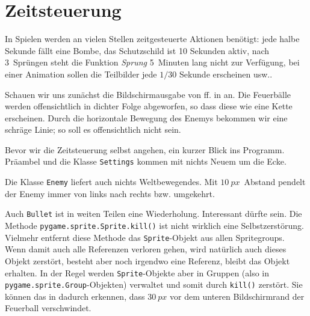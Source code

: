 \newpage
\section{Zeitsteuerung}\label{secZeitstuerung}
In Spielen werden an vielen Stellen zeitgesteuerte Aktionen benötigt: jede halbe Sekunde fällt eine Bombe, das Schutzschild ist 10 Sekunden aktiv, nach 3~Sprüngen steht die Funktion \emph{Sprung} 5~Minuten lang nicht zur Verfügung, bei einer Animation sollen die Teilbilder jede $1/30$ Sekunde erscheinen usw..

Schauen wir uns zunächst die Bildschirmausgabe von ff. in  an. Die Feuerbälle werden offensichtlich in dichter Folge abgeworfen, so dass diese wie eine Kette erscheinen. Durch die horizontale Bewegung des Enemys bekommen wir eine schräge Linie; so soll es offensichtlich nicht sein. 


Bevor wir die Zeitsteuerung selbst angehen, ein kurzer Blick ins Programm. Präambel und die Klasse \texttt{Settings} kommen mit nichts Neuem um die Ecke.


Die Klasse \texttt{Enemy} liefert auch nichts Weltbewegendes. Mit $10~px$~Abstand pendelt der Enemy immer von links nach rechts bzw. umgekehrt.


Auch \texttt{Bullet} ist in weiten Teilen eine Wiederholung. Interessant dürfte  sein. Die Methode \texttt{pygame.sprite.Sprite.kill()} ist nicht wirklich eine Selbstzerstörung. Vielmehr entfernt diese Methode das \texttt{Sprite}-Objekt aus allen Spritegroups. Wenn damit auch alle Referenzen verloren gehen, wird natürlich auch dieses Objekt zerstört, besteht aber noch irgendwo eine Referenz, bleibt das Objekt erhalten. In der Regel werden \texttt{Sprite}-Objekte aber in Gruppen (also in \texttt{pygame.sprite.Group}-Objekten) verwaltet und somit durch \texttt{kill()} zerstört. Sie können das in  dadurch erkennen, dass $30~px$ vor dem unteren Bildschirmrand der Feuerball verschwindet.

